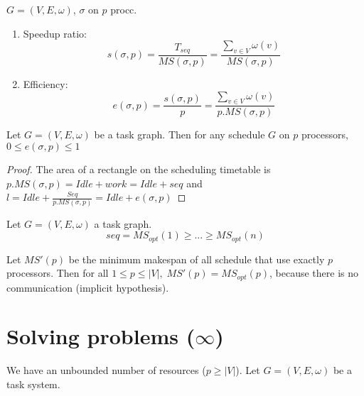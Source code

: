 \begin{defi}
$G=(V,E,\omega)$, $\sigma$ on $p$ procc.
\begin{enumerate}
\item Speedup ratio:
\[s(\sigma, p)=\frac{T_{seq}}{MS(\sigma,p)} = \frac{\sum_{v\in V} \omega (v)}{MS(\sigma,p)}\]
\item Efficiency:
\[e(\sigma, p)=\frac{s(\sigma, p)}{p} = \frac{\sum_{v\in V} \omega (v)}{p.MS(\sigma,p)}\]
\end{enumerate}
\end{defi}


\begin{thm}
Let $G=(V,E,\omega)$ be a task graph. Then for any schedule $G$ on $p$ processors, $0\leq e(\sigma, p) \leq 1$
\end{thm}

\begin{proof}
The area of a rectangle on the scheduling timetable is $p.MS(\sigma, p)=Idle+work=Idle+seq$ and $l=Idle + \frac{Seq}{p.MS(\sigma,p)}=Idle+e(\sigma,p)$
\end{proof}

\begin{thm}
Let $G=(V,E,\omega)$ a task graph.
\[seq=MS_{opt}(1)\geq ... \geq MS_{opt}(n)\]
\end{thm}

Let $MS'(p)$ be the minimum makespan of all schedule that use exactly $p$ processors. Then for all $1\leq p \leq |V|, \; MS'(p)=MS_{opt}(p)$, because there is no communication (implicit hypothesis).



\section{Solving problems ($\infty$)}
We have an unbounded number of resources ($p\geq |V|$). Let $G=(V,E,\omega)$ be a task system.

